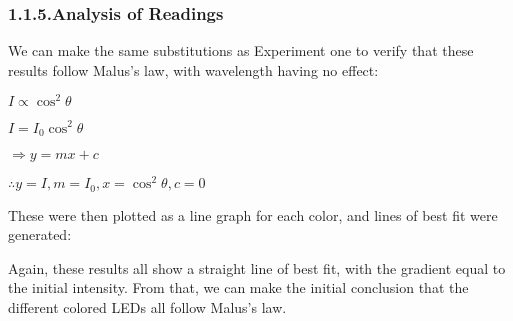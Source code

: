 \documentclass{article}
\begin{document}
\subsubsection{1.1.5.\hspace*{0.5em}Analysis of Readings}\label{sec-analysis-of-readings}%

\noindent{}We can make the same substitutions as Experiment one to verify that these results follow Malus's law, with wavelength having no effect:%

$I\propto\cos^2\theta$%

$I=I_0\cos^2\theta$%

$\Rightarrow y=mx+c$%

$\therefore y=I, m=I_0, x=\cos^2\theta, c=0$%

These were then plotted as a line graph for each color, and lines of best fit were generated:%

Again, these results all show a straight line of best fit, with the gradient equal to the initial intensity. From that, we can make the initial conclusion that the different colored LEDs all follow Malus's law.%
\end{document}
